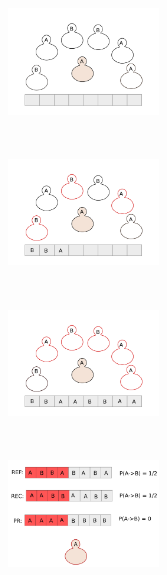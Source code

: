 \documentclass[11 pt , letterpaper , twoside , openright]{book}
\begin{document}
\begin{figure}[H]
  \begin{subfigure}[b]{0.24\textwidth}
    \caption{}
  	\includegraphics[width=4cm, height=3.5cm]{drawing.png}
  \end{subfigure}
  \begin{subfigure}[b]{0.24\textwidth}
    \caption{}
  	\includegraphics[width=4cm, height=3.5cm]{drawing1.png}
  \end{subfigure}
  \begin{subfigure}[b]{0.24\textwidth}
    \caption{}
  	\includegraphics[width=4cm, height=3.5cm]{drawing2.png}
  \end{subfigure}
  \begin{subfigure}[b]{0.24\textwidth}
    \caption{}
  	\includegraphics[width=4cm, height=3.5cm]{drawing3.png}
  \end{subfigure}
  \captionsetup{format=plain}

\end{figure}
\end{document}
